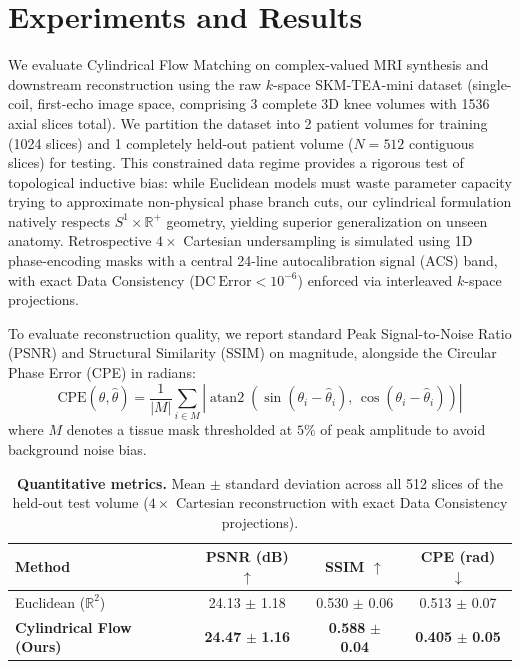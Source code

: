 \section{Experiments and Results}
\label{sec:experiments}

We evaluate Cylindrical Flow Matching on complex-valued MRI synthesis and downstream reconstruction using the raw $k$-space SKM-TEA-mini dataset \citep{desai2021skmtea} (single-coil, first-echo image space, comprising 3 complete 3D knee volumes with 1536 axial slices total). We partition the dataset into 2 patient volumes for training (1024 slices) and 1 completely held-out patient volume ($N=512$ contiguous slices) for testing. This constrained data regime provides a rigorous test of topological inductive bias: while Euclidean models must waste parameter capacity trying to approximate non-physical phase branch cuts, our cylindrical formulation natively respects $S^1 \times \mathbb{R}^+$ geometry, yielding superior generalization on unseen anatomy. Retrospective $4\times$ Cartesian undersampling is simulated using 1D phase-encoding masks with a central 24-line autocalibration signal (ACS) band, with exact Data Consistency ($\mathrm{DC\ Error} < 10^{-6}$) enforced via interleaved $k$-space projections.

To evaluate reconstruction quality, we report standard Peak Signal-to-Noise Ratio (PSNR) and Structural Similarity (SSIM) on magnitude, alongside the Circular Phase Error (CPE) in radians:
\begin{equation}
    \mathrm{CPE}(\theta, \hat{\theta}) = \frac{1}{|M|} \sum_{i \in M} |\operatorname{atan2}(\sin(\theta_i - \hat{\theta}_i),\, \cos(\theta_i - \hat{\theta}_i))|
\end{equation}
where $M$ denotes a tissue mask thresholded at $5\%$ of peak amplitude to avoid background noise bias.

\begin{table}[t]
    \centering
    \small
    \caption{\textbf{Quantitative metrics.} Mean $\pm$ standard deviation across all 512 slices of the held-out test volume ($4\times$ Cartesian reconstruction with exact Data Consistency projections).}
    \vspace{1mm}
    \begin{tabular}{lccc}
        \toprule
        \textbf{Method} & \textbf{PSNR (dB) $\uparrow$} & \textbf{SSIM $\uparrow$} & \textbf{CPE (rad) $\downarrow$} \\
        \midrule
        Euclidean ($\mathbb{R}^2$) & 24.13 $\pm$ 1.18 & 0.530 $\pm$ 0.06 & 0.513 $\pm$ 0.07 \\
        \textbf{Cylindrical Flow (Ours)} & \textbf{24.47} $\pm$ \textbf{1.16} & \textbf{0.588} $\pm$ \textbf{0.04} & \textbf{0.405} $\pm$ \textbf{0.05} \\
        \bottomrule
    \end{tabular}
    \label{tab:results_metrics}
    \vspace{-1mm}
\end{table}

